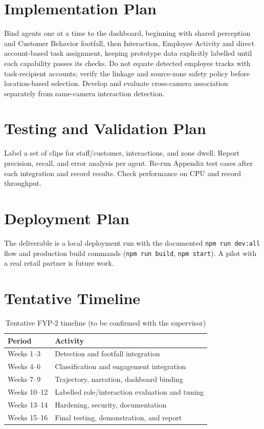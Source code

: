 \section{Implementation Plan}
Bind agents one at a time to the dashboard, beginning with shared perception and Customer Behavior footfall, then Interaction, Employee Activity and direct account-based task assignment, keeping prototype data explicitly labelled until each capability passes its checks. Do not equate detected employee tracks with task-recipient accounts; verify the linkage and source-zone safety policy before location-based selection. Develop and evaluate cross-camera association separately from same-camera interaction detection.

\section{Testing and Validation Plan}
Label a set of clips for staff/customer, interactions, and zone dwell. Report precision, recall, and error analysis per agent. Re-run Appendix test cases after each integration and record results. Check performance on CPU and record throughput.

\section{Deployment Plan}
The deliverable is a local deployment run with the documented \texttt{npm run dev:all} flow and production build commands (\texttt{npm run build}, \texttt{npm start}). A pilot with a real retail partner is future work.

\section{Tentative Timeline}
\begin{table}[H]
\centering
\caption{Tentative FYP-2 timeline (to be confirmed with the supervisor)}
\begin{tabular}{P{0.2\textwidth}P{0.67\textwidth}}
\toprule
Period & Activity\\
\midrule
Weeks 1--3 & Detection and footfall integration\\
Weeks 4--6 & Classification and engagement integration\\
Weeks 7--9 & Trajectory, narration, dashboard binding\\
Weeks 10--12 & Labelled role/interaction evaluation and tuning\\
Weeks 13--14 & Hardening, security, documentation\\
Weeks 15--16 & Final testing, demonstration, and report\\
\bottomrule
\end{tabular}
\end{table}

